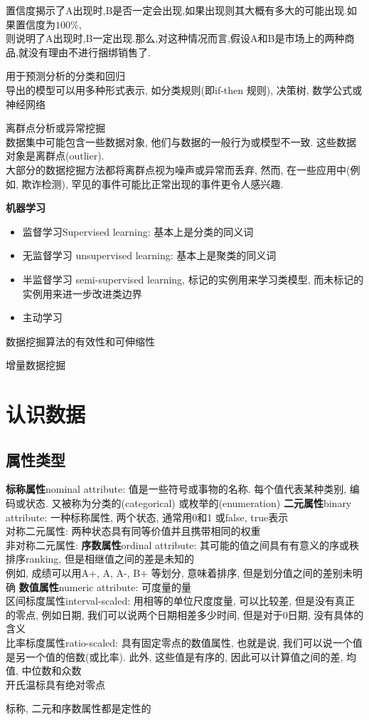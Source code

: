 \documentclass{article}
\begin{document}
置信度揭示了A出现时,B是否一定会出现,如果出现则其大概有多大的可能出现.如果置信度为$100\%$,\\
则说明了A出现时,B一定出现.那么,对这种情况而言,假设A和B是市场上的两种商品,就没有理由不进行捆绑销售了.

用于预测分析的分类和回归\\
导出的模型可以用多种形式表示, 如分类规则(即if-then 规则), 决策树, 数学公式或神经网络\par
离群点分析或异常挖掘\\
数据集中可能包含一些数据对象, 他们与数据的一般行为或模型不一致. 这些数据对象是离群点(outlier).\\
大部分的数据挖掘方法都将离群点视为噪声或异常而丢弃, 然而, 在一些应用中(例如, 欺诈检测), 罕见的事件可能比正常出现的事件更令人感兴趣.

\textbf{机器学习}
\begin{itemize}
\item 监督学习Supervised learning: 基本上是分类的同义词
\item 无监督学习 unsupervised learning: 基本上是聚类的同义词
\item 半监督学习 semi-supervised learning, 标记的实例用来学习类模型, 而未标记的实例用来进一步改进类边界
\item 主动学习
\end{itemize}

数据挖掘算法的有效性和可伸缩性\par
增量数据挖掘

\section{认识数据}
\subsection{属性类型}
\textbf{标称属性}nominal attribute: 值是一些符号或事物的名称. 每个值代表某种类别, 编码或状态. 又被称为分类的(categorical) 或枚举的(enumeration)
\textbf{二元属性}binary attribute: 一种标称属性, 两个状态, 通常用0和1 或false, true表示\\
对称二元属性: 两种状态具有同等价值并且携带相同的权重\\
非对称二元属性:
\textbf{序数属性}ordinal attribute: 其可能的值之间具有有意义的序或秩排序ranking, 但是相继值之间的差是未知的\\
例如, 成绩可以用A+, A, A-, B+ 等划分, 意味着排序, 但是划分值之间的差别未明确
\textbf{数值属性}numeric attribute: 可度量的量\\
	区间标度属性interval-scaled: 用相等的单位尺度度量, 可以比较差, 但是没有真正的零点, 例如日期, 我们可以说两个日期相差多少时间, 但是对于0日期, 没有具体的含义\\
	比率标度属性ratio-scaled: 具有固定零点的数值属性, 也就是说, 我们可以说一个值是另一个值的倍数(或比率). 此外, 这些值是有序的, 因此可以计算值之间的差, 均值, 中位数和众数\\
	开氏温标具有绝对零点\par
标称, 二元和序数属性都是定性的
\end{document}
